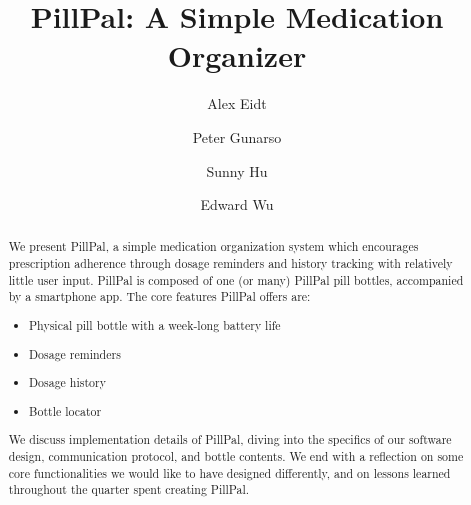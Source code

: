 \documentclass[sigconf]{acmart}
\begin{document}
\title{PillPal: A Simple Medication Organizer}

\author{Alex Eidt}

\author{Peter Gunarso}

\author{Sunny Hu}

\author{Edward Wu}

\renewcommand{\shortauthors}{Eidt, Gunarso, Hu, and Wu}

\begin{abstract}
  We present PillPal, a simple medication organization system which encourages prescription adherence through dosage reminders and history tracking with relatively little user input. PillPal is composed of one (or many) PillPal pill bottles, accompanied by a smartphone app. The core features PillPal offers are:
  \begin{itemize}
    \item Physical pill bottle with a week-long battery life
    \item Dosage reminders
    \item Dosage history
    \item Bottle locator
  \end{itemize}
  We discuss implementation details of PillPal, diving into the specifics of our software design, communication protocol, and bottle contents. We end with a reflection on some core functionalities we would like to have designed differently, and on lessons learned throughout the quarter spent creating PillPal.
\end{abstract}
\end{document}
